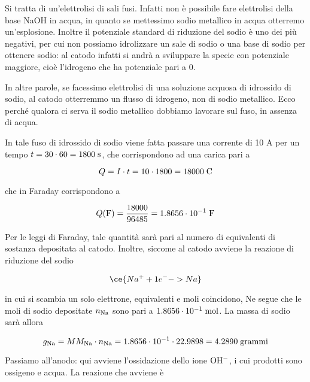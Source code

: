 \vspace{0.2cm}Si tratta di un'elettrolisi di sali fusi. Infatti non è possibile fare elettrolisi della base NaOH in acqua, in quanto se mettessimo sodio metallico in acqua otterremo un'esplosione. Inoltre il potenziale standard di riduzione del sodio è uno dei più negativi, per cui non possiamo idrolizzare un sale di sodio o una base di sodio per ottenere sodio: al catodo infatti si andrà a sviluppare la specie con potenziale maggiore, cioè l'idrogeno che ha potenziale pari a 0.

In altre parole, se facessimo elettrolisi di una soluzione acquosa di idrossido di sodio, al catodo otterremmo un flusso di idrogeno, non di sodio metallico. Ecco perché qualora ci serva il sodio metallico dobbiamo lavorare sul fuso, in assenza di acqua.

\vspace{0.2cm}In tale fuso di idrossido di sodio viene fatta passare una corrente di 10 A per un tempo $t=30 \cdot 60=1800 \; \rm s$, che corrispondono ad una carica pari a

\begin{equation*}
    Q=I \cdot t=10 \cdot 1800=18000 \; \rm C
\end{equation*}

che in Faraday corrispondono a

\begin{equation*}
    Q(\rm F)=\frac{18000}{96485}=1.8656 \cdot 10^{-1} \; F
\end{equation*}

Per le leggi di Faraday, tale quantità sarà pari al numero di equivalenti di sostanza depositata al catodo. Inoltre, siccome al catodo avviene la reazione di riduzione del sodio

\begin{equation*}
    \ce{Na^+ + 1e^- -> Na}
\end{equation*}

in cui si scambia un solo elettrone, equivalenti e moli coincidono, Ne segue che le moli di sodio depositate $n_{\rm Na}$ sono pari a $1.8656 \cdot 10^{-1} \; \rm mol$. La massa di sodio sarà allora

\begin{equation*}
    g_{\rm Na}=MM_{\rm Na} \cdot n_{\rm Na}
    =1.8656 \cdot 10^{-1} \cdot 22.9898
    =4.2890 \; \rm grammi
\end{equation*}

Passiamo all'anodo: qui avviene l'ossidazione dello ione $\rm OH^-$, i cui prodotti sono ossigeno e acqua. La reazione che avviene è


